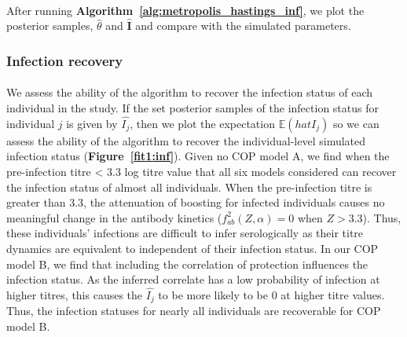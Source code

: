 \paragraph{} After running \textbf{Algorithm~\ref{alg:metropolis_hastings_inf}}, we plot the posterior samples, $\hat{\theta}$ and $\hat{\mathbf{I}}$ and compare with the simulated parameters.

\subsubsection{Infection recovery}

\paragraph{}We assess the ability of the algorithm to recover the infection status of each individual in the study. If the set posterior samples of the infection status for individual $j$ is given by $\hat{I_j} $, then we plot the expectation $\mathbb{E}(hat{I_j} )$ so we can assess the ability of the algorithm to recover the individual-level simulated infection status (\textbf{Figure~\ref{fit1:inf}}). Given no COP model A, we find when the pre-infection titre < 3.3 log titre value that all six models considered can recover the infection status of almost all individuals. When the pre-infection titre is greater than 3.3, the attenuation of boosting for infected individuals causes no meaningful change in the antibody kinetics ($f^2_{ab}(Z, \alpha) = 0$ when $Z > 3.3$). Thus, these individuals' infections are difficult to infer serologically as their titre dynamics are equivalent to independent of their infection status. In our COP model B, we find that including the correlation of protection influences the infection status. As the inferred correlate has a low probability of infection at higher titres, this causes the $\hat{I_j}$ to be more likely to be 0 at higher titre values. Thus, the infection statuses for nearly all individuals are recoverable for COP model B.

